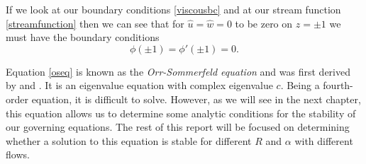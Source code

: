 If we look at our boundary conditions \eqref{viscousbc} and at our stream function \eqref{streamfunction} then we can see that for $ \hat{u} = \hat{w} = 0$ to be zero on $ z = \pm 1 $  we must have the boundary conditions
\begin{equation}
    \phi(\pm 1) = \phi'(\pm 1) = 0.
    \label{osbc}
\end{equation}

Equation \eqref{oseq} is known as the \emph{Orr-Sommerfeld equation} and was first derived by \citet{zbMATH02645274} and \citet{sommerfeld1909beitrag}. It is an eigenvalue equation with complex eigenvalue $ c$. Being a fourth-order equation, it is difficult to solve. However, as we will see in the next chapter, this equation allows us to determine some analytic conditions for the stability of our governing equations. The rest of this report will be focused on determining whether a solution to this equation is stable for different $R$ and $ \alpha $ with different flows.











